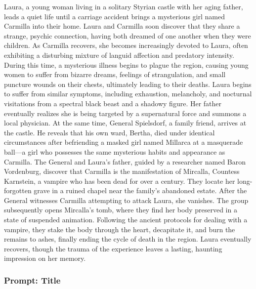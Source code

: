 \documentclass{article} %
\begin{document}
Laura, a young woman living in a solitary Styrian castle with her aging father, leads a quiet life until a carriage accident brings a mysterious girl named Carmilla into their home. Laura and Carmilla soon discover that they share a strange, psychic connection, having both dreamed of one another when they were children. As Carmilla recovers, she becomes increasingly devoted to Laura, often exhibiting a disturbing mixture of languid affection and predatory intensity. During this time, a mysterious illness begins to plague the region, causing young women to suffer from bizarre dreams, feelings of strangulation, and small puncture wounds on their chests, ultimately leading to their deaths. Laura begins to suffer from similar symptoms, including exhaustion, melancholy, and nocturnal visitations from a spectral black beast and a shadowy figure. Her father eventually realizes she is being targeted by a supernatural force and summons a local physician. At the same time, General Spielsdorf, a family friend, arrives at the castle. He reveals that his own ward, Bertha, died under identical circumstances after befriending a masked girl named Millarca at a masquerade ball—a girl who possesses the same mysterious habits and appearance as Carmilla. The General and Laura’s father, guided by a researcher named Baron Vordenburg, discover that Carmilla is the manifestation of Mircalla, Countess Karnstein, a vampire who has been dead for over a century. They locate her long-forgotten grave in a ruined chapel near the family’s abandoned estate. \textcolor{skipred}{After the General witnesses Carmilla attempting to attack Laura, she vanishes.} The group subsequently opens Mircalla's tomb, where they find her body preserved in a state of suspended animation. Following the ancient protocols for dealing with a vampire, they stake the body through the heart, decapitate it, and burn the remains to ashes, finally ending the cycle of death in the region. \textcolor{skipred}{Laura eventually recovers, though the trauma of the experience leaves a lasting, haunting impression on her memory.}

\subsubsection{Prompt: Title}
\end{document}
